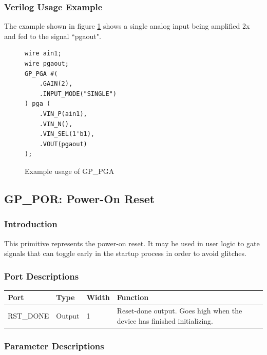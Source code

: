 \documentclass{article}
\begin{document}
\pagebreak
\subsubsection{Verilog Usage Example}

The example shown in figure \ref{gp-pga-example} shows a single analog input being amplified 2x and fed to the signal 
``pgaout".

\begin{figure}[h]
\begin{lstlisting}
wire ain1;
wire pgaout;
GP_PGA #(
	.GAIN(2),
	.INPUT_MODE("SINGLE")
) pga (
	.VIN_P(ain1),
	.VIN_N(),
	.VIN_SEL(1'b1),
	.VOUT(pgaout)
);
\end{lstlisting}
\caption{Example usage of GP\_PGA}
\label{gp-pga-example}
\end{figure}


\pagebreak
\clearpage
\subsection{GP\_POR: Power-On Reset}

\subsubsection{Introduction}
This primitive represents the power-on reset. It may be used in user logic to gate signals that can toggle early in the 
startup process in order to avoid glitches.


\subsubsection{Port Descriptions}

\begin{tabularx}{5in}{|l|l|l|X|}
\hline
{\bfseries Port} & {\bfseries Type} & {\bfseries Width} & {\bfseries Function} \\
\hline
RST\_DONE & Output & 1 & Reset-done output. Goes high when the device has finished initializing.\\
\hline
\end{tabularx}

\subsubsection{Parameter Descriptions}
\end{document}
